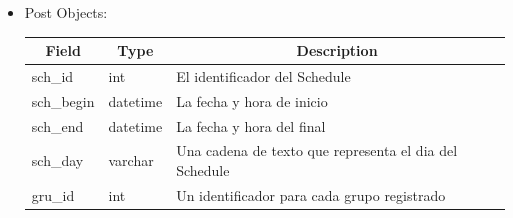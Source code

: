 \documentclass{article}
\begin{document}
\begin{enumerate}
\begin{itemize}
        \item Post Objects:
        \begin{table}[H] \centering \begin{tabular}{|l|l|l|} \hline
        \multicolumn{1}{|c|}{\textbf{Field}} &
        \multicolumn{1}{c|}{\textbf{Type}} &
        \multicolumn{1}{c|}{\textbf{Description}} \\ \hline sch\_id & int & El
        identificador del Schedule \\ \hline sch\_begin & datetime & La fecha y
        hora de inicio \\ \hline sch\_end & datetime & La fecha y hora del final
        \\ \hline sch\_day & varchar & Una cadena de texto que representa el dia
        del Schedule \\ \hline gru\_id & int & Un identificador para cada grupo
        registrado \\ \hline \end{tabular} \end{table}
    \end{itemize}


\end{enumerate}
\end{document}
